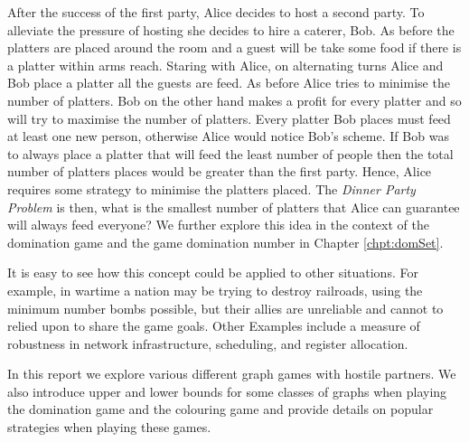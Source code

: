 
After the success of the first party, Alice decides to host a second party. To alleviate the pressure of hosting she decides to hire a caterer, Bob. As before the platters are placed around the room and a guest will be take some food if there is a platter within arms reach. Staring with Alice, on alternating turns Alice and Bob place a platter all the guests are feed. As before Alice tries to minimise the number of platters. Bob on the other hand makes a profit for every platter and so will try to maximise the number of platters. Every platter Bob places must feed at least one new person, otherwise Alice would notice Bob's scheme.
If Bob was to always place a platter that will feed the least number of people then the total number of platters places would be greater than the first party. Hence, Alice requires some strategy to minimise the platters placed. The \textit{Dinner Party Problem} is then, what is the smallest number of platters that Alice can guarantee will always feed everyone? 
We further explore this idea in the context of the domination game and the game domination number in Chapter \ref{chpt:domSet}.

It is easy to see how this concept could be applied to other situations. For example, in wartime a nation may be trying to destroy railroads, using the minimum number bombs possible, but their allies are unreliable and cannot to relied upon to share the game goals. Other Examples include a measure of robustness in network infrastructure, scheduling, and register allocation.  

In this report %
we explore various different graph games with hostile partners. We also introduce upper and lower bounds for some classes of graphs when playing the domination game and the colouring game and provide details on popular strategies when playing these games.





